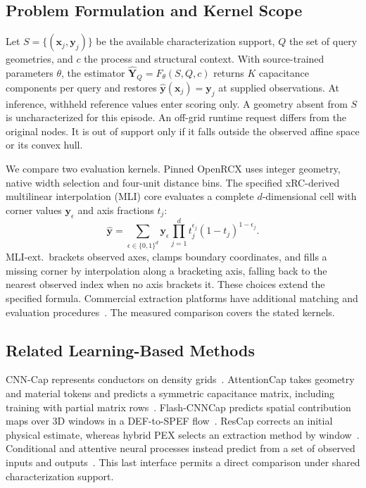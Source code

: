 \documentclass[conference,9pt,letterpaper]{IEEEtran}
\begin{document}
\subsection{Problem Formulation and Kernel Scope}
Let $S=\{(\mathbf{x}_j,\mathbf{y}_j)\}$ be the available characterization support, $Q$ the set of query geometries, and $c$ the process and structural context. With source-trained parameters $\theta$, the estimator $\widehat{\mathbf Y}_Q=F_\theta(S,Q,c)$ returns $K$ capacitance components per query and restores $\widehat{\mathbf y}(\mathbf{x}_j)=\mathbf{y}_j$ at supplied observations. At inference, withheld reference values enter scoring only. A geometry absent from $S$ is uncharacterized for this episode. An off-grid runtime request differs from the original nodes. It is out of support only if it falls outside the observed affine space or its convex hull.

We compare two evaluation kernels. Pinned OpenRCX uses integer geometry, native width selection and four-unit distance bins. The specified xRC-derived multilinear interpolation (MLI) core evaluates a complete $d$-dimensional cell with corner values $\mathbf y_\epsilon$ and axis fractions $t_j$:
\begin{equation}
\widehat{\mathbf y}=\sum_{\epsilon\in\{0,1\}^d}\mathbf y_\epsilon
\prod_{j=1}^d t_j^{\epsilon_j}(1-t_j)^{1-\epsilon_j}.
\end{equation}
MLI-ext.\ brackets observed axes, clamps boundary coordinates, and fills a missing corner by interpolation along a bracketing axis, falling back to the nearest observed index when no axis brackets it. These choices extend the specified formula. Commercial extraction platforms have additional matching and evaluation procedures~\cite{siemens_calibre_xrc,siemens_calibre_xact,siemens_calibre_xact3d,synopsys_starrc}. The measured comparison covers the stated kernels.

\subsection{Related Learning-Based Methods}
CNN-Cap represents conductors on density grids~\cite{yang2023cnncap}. AttentionCap takes geometry and material tokens and predicts a symmetric capacitance matrix, including training with partial matrix rows~\cite{attentioncap}. Flash-CNNCap predicts spatial contribution maps over 3D windows in a DEF-to-SPEF flow~\cite{flash}. ResCap corrects an initial physical estimate, whereas hybrid PEX selects an extraction method by window~\cite{rescap,hybrid}. Conditional and attentive neural processes instead predict from a set of observed inputs and outputs~\cite{cnp,anp}. This last interface permits a direct comparison under shared characterization support.


\end{document}
